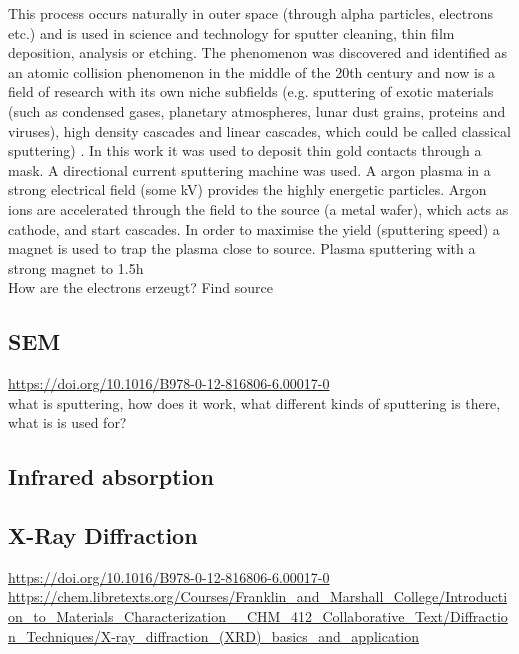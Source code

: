 This process occurs naturally in outer space (through alpha particles, electrons etc.) 
and is used in science and technology for 
sputter cleaning, thin film deposition, analysis or etching. 
The phenomenon was discovered and identified as an atomic collision phenomenon in the 
middle of the 20th century and now is a field of research with its own niche subfields 
(e.g. sputtering of exotic materials (such as condensed gases, planetary
atmospheres, lunar dust grains, proteins and viruses), high density cascades and 
linear cascades, which could be called classical sputtering)
\cite{Sigmund1987}.
%
In this work it was used to deposit thin gold contacts through a mask. 
A directional current sputtering machine was used. 
A argon plasma in a strong electrical field (some kV) provides the highly energetic particles. 
Argon ions are accelerated through the field to the source (a metal wafer), which acts as cathode, and start cascades. 
In order to maximise the yield (sputtering speed) a magnet is used to trap the plasma close to source. 
Plasma sputtering with a strong magnet to 
1.5h 
\\
How are the electrons erzeugt? 
Find source

\subsection{SEM}
\url{https://doi.org/10.1016/B978-0-12-816806-6.00017-0}\\
what is sputtering, how does it work, what different kinds of sputtering is there, what is is used for? 
\subsection{Infrared absorption}
\subsection{X-Ray Diffraction}
\url{https://doi.org/10.1016/B978-0-12-816806-6.00017-0}\\
\url{https://chem.libretexts.org/Courses/Franklin_and_Marshall_College/Introduction_to_Materials_Characterization__CHM_412_Collaborative_Text/Diffraction_Techniques/X-ray_diffraction_(XRD)_basics_and_application}\\
